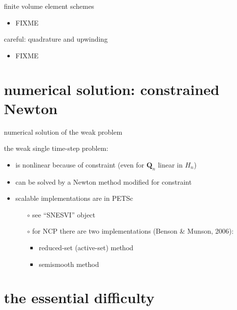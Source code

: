 \documentclass{beamer}
\newcommand\bQ{\mathbf{Q}}
\begin{document}
\begin{frame}{finite volume element schemes}

\begin{itemize}
\item FIXME
\end{itemize}

\end{frame}


\begin{frame}{careful: quadrature and upwinding}

\begin{itemize}
\item FIXME
\end{itemize}

\end{frame}


\section{numerical solution: constrained Newton}

\begin{frame}{numerical solution of the weak problem}

the weak single time-step problem:
\begin{itemize}
\item is nonlinear because of constraint (even for $\bQ_n$ linear in $H_n$)
\item can be solved by a Newton method modified for constraint
\item scalable implementations are in PETSc
  \begin{itemize}
  \item[$\circ$]  see ``SNESVI'' object
  \item[$\circ$]  for NCP there are two implementations (Benson \& Munson, 2006):
    \begin{itemize}
    \item  reduced-set (active-set) method
    \item  semismooth method
    \end{itemize}
  \end{itemize}
\end{itemize}

\end{frame}


\section{the essential difficulty} %
\end{document}
